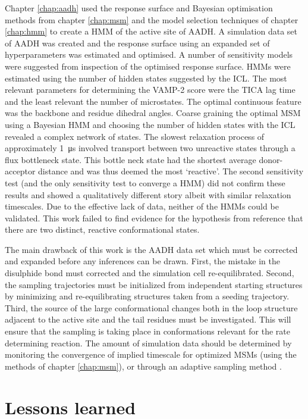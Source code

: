 Chapter \ref{chap:aadh} used the response surface and Bayesian optimisation methods from chapter \ref{chap:msm} and the model selection techniques of chapter \ref{chap:hmm} to create a HMM of the active site of AADH. A simulation data set of AADH was created and the response surface using an expanded set of hyperparameters was estimated and optimised. A number of sensitivity models were suggested from inspection of the optimised response surface. HMMs were estimated using the number of hidden states suggested by the ICL. The most relevant parameters for determining the VAMP-2 score were the TICA lag time and the least relevant the number of microstates.  The optimal continuous feature was the backbone and residue dihedral angles. Coarse graining the optimal MSM using a Bayesian HMM and choosing the number of hidden states with the ICL revealed a complex network of states. The slowest relaxation process of approximately \SI{1}{\micro\second} involved transport between two unreactive states through a flux bottleneck state. This bottle neck state had the shortest average donor-acceptor distance and was thus deemed the most `reactive'. The second sensitivity test (and the only sensitivity test to converge a HMM) did not confirm these results and showed a qualitatively different story albeit with similar relaxation timescales. Due to the effective lack of data, neither of the HMMs could be validated. This work failed to find evidence for the hypothesis from reference \cite{glowackiTakingOckhamRazor2012b} that there are two distinct, reactive conformational states. 

The main drawback of this work is the AADH data set which must be corrected and expanded before any inferences can be drawn. First, the mistake in the disulphide bond must corrected and the simulation cell re-equilibrated. Second, the sampling trajectories must be initialized from independent starting structures by minimizing and re-equilibrating structures taken from a seeding trajectory. Third, the source of the large conformational changes both in the loop structure adjacent to the active site and the tail residues must be investigated. This will ensure that the sampling is taking place in  conformations relevant for the rate determining reaction. The amount of simulation data should be determined by monitoring the convergence of implied timescale  for optimized MSMs (using the methods of chapter \ref{chap:msm}), or through an adaptive sampling method \cite{doerrOntheFlyLearningSampling2014}. 

\section{Lessons learned}

